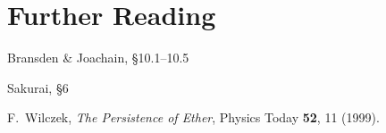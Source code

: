 \documentclass[pra,12pt]{revtex4}
\begin{document}
\section*{Further Reading}

\begin{enumerate}[[1{]}]
\item Bransden \& Joachain, \S10.1--10.5

\item Sakurai, \S6

\item F.~Wilczek, \textit{The Persistence of Ether}, Physics Today
  \textbf{52}, 11 (1999).
\label{cite:wilczek}
\end{enumerate}
\end{document}
